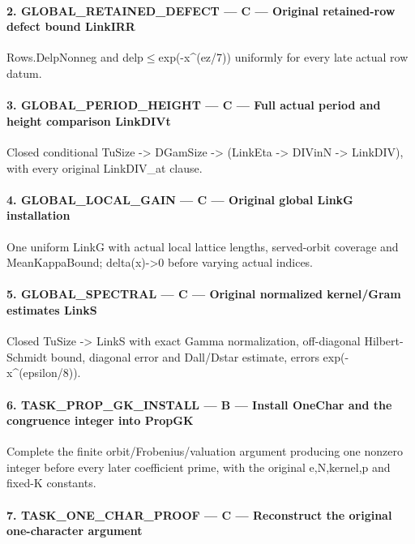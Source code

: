 \paragraph{2. GLOBAL\_\allowbreak{}RETAINED\_\allowbreak{}DEFECT — C — Original retained-row defect bound LinkIRR}

Rows.DelpNonneg and delp$\le$exp(-x\textasciicircum{}(ez/\allowbreak{}7)) uniformly for every late actual row datum.

\paragraph{3. GLOBAL\_\allowbreak{}PERIOD\_\allowbreak{}HEIGHT — C — Full actual period and height comparison LinkDIVt}

Closed conditional TuSize -> DGamSize -> (LinkEta -> DIVinN -> LinkDIV), with every original LinkDIV\_\allowbreak{}at clause.

\paragraph{4. GLOBAL\_\allowbreak{}LOCAL\_\allowbreak{}GAIN — C — Original global LinkG installation}

One uniform LinkG with actual local lattice lengths, served-orbit coverage and MeanKappaBound; delta(x)->0 before varying actual indices.

\paragraph{5. GLOBAL\_\allowbreak{}SPECTRAL — C — Original normalized kernel/\allowbreak{}Gram estimates LinkS}

Closed TuSize -> LinkS with exact Gamma normalization, off-diagonal Hilbert-Schmidt bound, diagonal error and Dall/\allowbreak{}Dstar estimate, errors exp(-x\textasciicircum{}(epsilon/\allowbreak{}8)).

\paragraph{6. TASK\_\allowbreak{}PROP\_\allowbreak{}GK\_\allowbreak{}INSTALL — B — Install OneChar and the congruence integer into PropGK}

Complete the finite orbit/\allowbreak{}Frobenius/\allowbreak{}valuation argument producing one nonzero integer before every later coefficient prime, with the original e,N,kernel,p and fixed-K constants.

\paragraph{7. TASK\_\allowbreak{}ONE\_\allowbreak{}CHAR\_\allowbreak{}PROOF — C — Reconstruct the original one-character argument}

